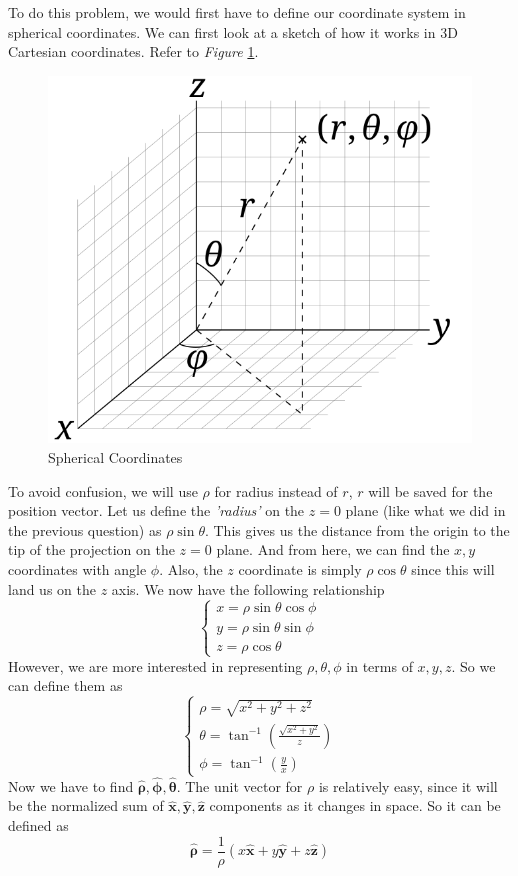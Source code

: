 \documentclass[12pt]{article}
\newcommand{\paren}[1]{\left( #1 \right)}
\newcommand{\unx}{\hat{\mathbf{x}}}
\newcommand{\uny}{\hat{\mathbf{y}}}
\newcommand{\unz}{\hat{\mathbf{z}}}
\newcommand{\untheta}{\hat{\boldsymbol\theta}}
\newcommand{\unphi}{\hat{\boldsymbol\phi}}
\newcommand{\unrho}{\hat{\boldsymbol\rho}}
\begin{document}
\begin{enumerate}
    To do this problem, we would first have to define our coordinate system in spherical coordinates. We can first look at a sketch of how it works in 3D Cartesian coordinates. Refer to \textit{Figure} \ref{fig:1.25}.
    \begin{figure}[!h]
        \centering
        \includegraphics[width=0.5\linewidth]{Pictures/PS00/3D_Spherical.svg.png}
        \caption{Spherical Coordinates}
        \label{fig:1.25}
    \end{figure}
    To avoid confusion, we will use $\rho$ for radius instead of $r$, $r$ will be saved for the position vector. Let us define the \textit{'radius'} on the $z=0$ plane (like what we did in the previous question) as $\rho\sin\theta$. This gives us the distance from the origin to the tip of the projection on the $z=0$ plane. And from here, we can find the $x,y$ coordinates with angle $\phi$. Also, the $z$ coordinate is simply $\rho\cos\theta$ since this will land us on the $z$ axis. We now have the following relationship
    \[
    \begin{cases}
        x = \rho\sin\theta\cos\phi\\
        y = \rho\sin\theta\sin\phi\\
        z = \rho\cos\theta
    \end{cases}
    \]
    However, we are more interested in representing $\rho,\theta,\phi$ in terms of $x,y,z$. So we can define them as
    \[
    \begin{cases}
        \rho = \sqrt{x^2 + y^2 + z^2}\\
        \theta = \tan^{-1}\paren{\frac{\sqrt{x^2+y^2}}{z}}\\
        \phi = \tan^{-1}\paren{\frac{y}{x}}
    \end{cases}
    \]
    Now we have to find $\unrho,\unphi,\untheta$. The unit vector for $\rho$ is relatively easy, since it will be the normalized sum of $\unx,\uny,\unz$ components as it changes in space. So it can be defined as
    \[
    \unrho = \frac{1}{\rho}\paren{x\unx + y\uny + z\unz}
\]
\end{enumerate}
\end{document}
